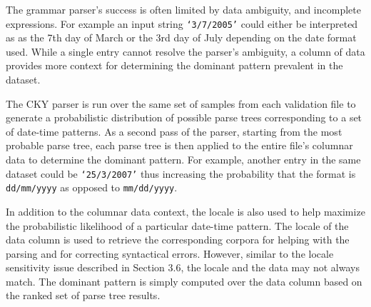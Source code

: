 The grammar parser's success is often limited by data ambiguity, and incomplete expressions. For example an input string \texttt{`3/7/2005'} could either be interpreted as as the 7th day of March or the 3rd day of July depending on the date format used. While a single entry cannot resolve the parser's ambiguity, a column of data provides more context for determining the dominant pattern prevalent in the dataset. 

The CKY parser is run over the same set of samples from each validation file to generate a probabilistic distribution of possible parse trees corresponding to a set of date-time patterns. As a second pass of the parser, starting from the most probable parse tree, each parse tree is then applied to the entire file's columnar data to determine the dominant pattern. For example, another entry in the same dataset could be \texttt{`25/3/2007'} thus increasing the probability that the format is \texttt{dd/mm/yyyy} as opposed to \texttt{mm/dd/yyyy}.

In addition to the columnar data context, the locale is also used to help maximize the probabilistic likelihood of a particular date-time pattern. The locale of the data column is used to retrieve the corresponding corpora for helping with the parsing and for correcting syntactical errors. However, similar to the locale sensitivity issue described in Section 3.6, the locale and the data may not always match. The dominant pattern is simply computed over the data column based on the ranked set of parse tree results.
